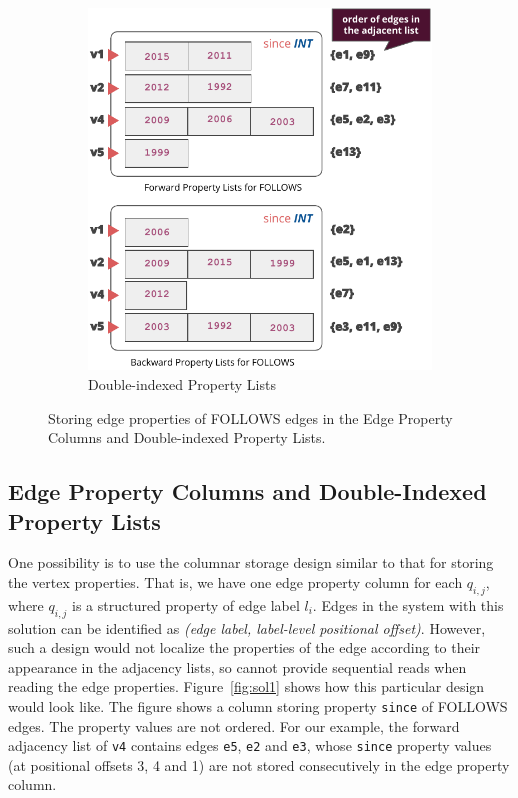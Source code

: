 \begin{figure}
\begin{subfigure}{0.55\textwidth}
		\includegraphics[scale=0.75]{img/sol2}
		\captionsetup{justification=centering}
		\caption{Double-indexed Property Lists}
		\label{fig:sol2}
	\end{subfigure}
	\captionsetup{justification=centering}
	\caption{Storing edge properties of FOLLOWS edges in the Edge Property Columns and Double-indexed Property Lists.}
	\label{fig:sol1and2}
\end{figure}

\subsection{Edge Property Columns and Double-Indexed Property Lists}

 One possibility is to use the columnar storage design similar to that for storing the vertex properties. That is, we have one edge property column for each $q_{i,j}$, where $q_{i,j}$ is a structured property of edge label $l_i$. Edges in the system with this solution can be identified as \emph{(edge label, label-level positional offset)}. However, such a design would not localize the properties of the edge according to their appearance in the adjacency lists, so cannot provide sequential reads when reading the edge properties. Figure~\ref{fig:sol1} shows how this particular design would look like. The figure shows a column storing property \texttt{since} of FOLLOWS edges. The property values are not ordered. For our example, the forward adjacency list of \texttt{v4} contains edges \texttt{e5}, \texttt{e2} and \texttt{e3}, whose \texttt{since} property values (at positional offsets 3, 4 and 1) are not stored consecutively in the edge property column. 


